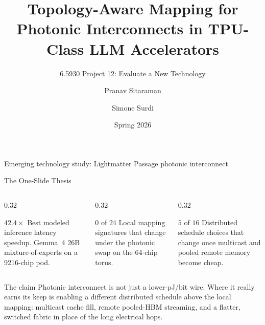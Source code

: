 \documentclass[10pt,aspectratio=169]{beamer}
\title[Photonic Interconnects for TPU LLMs]{Topology-Aware Mapping for Photonic Interconnects in TPU-Class LLM Accelerators}
\subtitle{6.5930 Project 12: Evaluate a New Technology}
\author[Sitaraman \& Surdi]{Pranav Sitaraman \and Simone Surdi}
\institute[MIT 6.5930]{Hardware Architectures for Deep Learning}
\date{Spring 2026}
\newcommand{\pjbit}{pJ/bit}
\begin{document}
\begin{frame}
  \titlepage
  \vspace{-0.4em}
  \begin{center}
    {\small Emerging technology study: Lightmatter Passage photonic interconnect}
  \end{center}
\end{frame}

\begin{frame}{The One-Slide Thesis}
  \begin{columns}[T,onlytextwidth]
    \begin{column}{0.32\textwidth}
      \begin{block}{$42.4\times$}
      Best modeled inference latency speedup. Gemma~4 26B mixture-of-experts on a 9216-chip pod.
      \end{block}
    \end{column}
    \begin{column}{0.32\textwidth}
      \begin{block}{$0$ of $24$}
      Local mapping signatures that change under the photonic swap on the 64-chip torus.
      \end{block}
    \end{column}
    \begin{column}{0.32\textwidth}
      \begin{block}{$5$ of $16$}
      Distributed schedule choices that change once multicast and pooled remote memory become cheap.
      \end{block}
    \end{column}
  \end{columns}
  \vspace{0.6em}
  \begin{block}{The claim}
  Photonic interconnect is not just a lower-\pjbit{} wire. Where it really earns its keep is enabling a different distributed schedule above the local mapping: multicast cache fill, remote pooled-HBM streaming, and a flatter, switched fabric in place of the long electrical hops.
  \end{block}
\end{frame}
\end{document}
